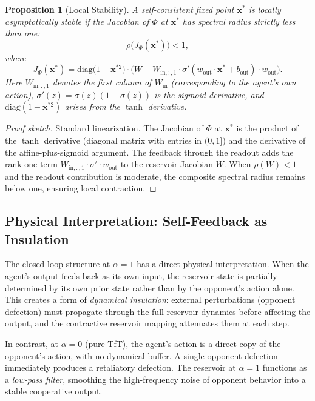 \documentclass[11pt,a4paper]{article}
\newtheorem{proposition}[theorem]{Proposition}
\theoremstyle{definition}
\newcommand{\Wres}{W}
\newcommand{\Wout}{w_{\mathrm{out}}}
\newcommand{\Win}{W_{\mathrm{in}}}
\newcommand{\xstate}{\mathbf{x}}
\newcommand{\bout}{b_{\mathrm{out}}}
\begin{document}
\begin{proposition}[Local Stability]
\label{prop:stability}
A self-consistent fixed point $\xstate^{*}$ is locally asymptotically stable
if the Jacobian of $\Phi$ at $\xstate^{*}$ has spectral radius strictly less
than one:
\begin{equation}
\label{eq:jacobian}
\rho\bigl(J_{\Phi}(\xstate^{*})\bigr) < 1,
\end{equation}
where
\begin{equation}
J_{\Phi}(\xstate^{*}) = \mathrm{diag}\bigl(1 - \xstate^{*2}\bigr)
  \cdot \bigl(\Wres + W_{\mathrm{in},{:,1}} \cdot \sigma'(\Wout \cdot \xstate^{*} + \bout)
  \cdot \Wout\bigr).
\end{equation}
Here $W_{\mathrm{in},{:,1}}$ denotes the first column of $\Win$ (corresponding to the
agent's own action), $\sigma'(z) = \sigma(z)(1-\sigma(z))$ is the sigmoid
derivative, and $\mathrm{diag}(1 - \xstate^{*2})$ arises from the $\tanh$
derivative.
\end{proposition}

\begin{proof}[Proof sketch]
Standard linearization.  The Jacobian of $\Phi$ at $\xstate^{*}$ is the
product of the $\tanh$ derivative (diagonal matrix with entries in $(0,1]$)
and the derivative of the affine-plus-sigmoid argument.  The feedback through
the readout adds the rank-one term $W_{\mathrm{in},{:,1}} \cdot \sigma' \cdot \Wout$
to the reservoir Jacobian $\Wres$.  When $\rho(\Wres) < 1$ and the readout
contribution is moderate, the composite spectral radius remains below one,
ensuring local contraction.
\end{proof}

\subsection{Physical Interpretation: Self-Feedback as Insulation}

The closed-loop structure at $\alpha = 1$ has a direct physical interpretation.
When the agent's output feeds back as its own input, the reservoir state
is partially determined by its own prior state rather than by the opponent's
action alone.  This creates a form of \emph{dynamical insulation}: external
perturbations (opponent defection) must propagate through the full reservoir
dynamics before affecting the output, and the contractive reservoir mapping
attenuates them at each step.

In contrast, at $\alpha = 0$ (pure TfT), the agent's action is a direct
copy of the opponent's action, with no dynamical buffer.  A single opponent
defection immediately produces a retaliatory defection.  The reservoir at
$\alpha = 1$ functions as a \emph{low-pass filter}, smoothing the high-frequency
noise of opponent behavior into a stable cooperative output.
\end{document}
